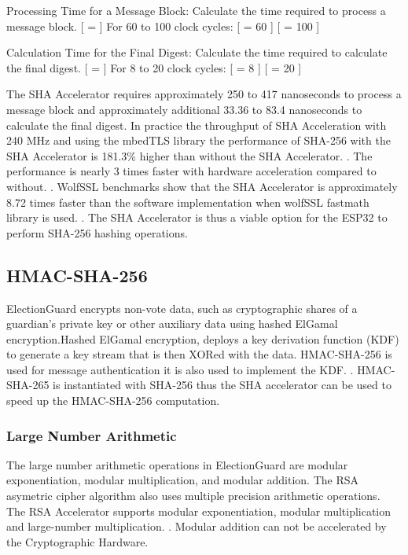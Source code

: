Processing Time for a Message Block: Calculate the time required to process a message block. [  =  \times {} ] For 60 to 100 clock cycles: [  = 60     ] [  = 100     ]

Calculation Time for the Final Digest: Calculate the time required to calculate the final digest. [  =  \times {} ] For 8 to 20 clock cycles: [  = 8     ] [  = 20     ]

The SHA Accelerator requires approximately 250 to 417 nanoseconds to process a message block and approximately additional 33.36 to 83.4 nanoseconds to calculate the final digest. In practice the throughput of SHA Acceleration with 240 MHz and using the mbedTLS library the performance of SHA-256 with the SHA Accelerator is 181.3\% higher than without the SHA Accelerator. \cite[41]{performance-evaluation}. The performance is nearly 3 times faster with hardware acceleration compared to without. \cite[41-42]{performance-evaluation}. WolfSSL benchmarks show that the SHA Accelerator is approximately 8.72 times faster than the software implementation when wolfSSL fastmath library is used. \cite{wolfssl-benchmark}. The SHA Accelerator is thus a viable option for the ESP32 to perform SHA-256 hashing operations.

\subsection{HMAC-SHA-256}
ElectionGuard encrypts non-vote data, such as cryptographic shares of a guardian’s private key or other auxiliary data using hashed ElGamal encryption.Hashed ElGamal encryption, deploys a key derivation function (KDF) to generate a key stream that is then XORed with the data. HMAC-SHA-256 is used for message authentication it is also used to implement the KDF. \cite[7]{eg-spec}. HMAC-SHA-265 is instantiated with SHA-256 thus the SHA accelerator can be used to speed up the HMAC-SHA-256 computation.


\subsubsection{Large Number Arithmetic}
The large number arithmetic operations in ElectionGuard are modular exponentiation, modular multiplication, and modular addition. The RSA asymetric cipher algorithm also uses multiple precision arithmetic operations. The RSA Accelerator supports modular exponentiation, modular multiplication and large-number multiplication. \cite[598]{esp32-ref}. Modular addition can not be accelerated by the Cryptographic Hardware. 

